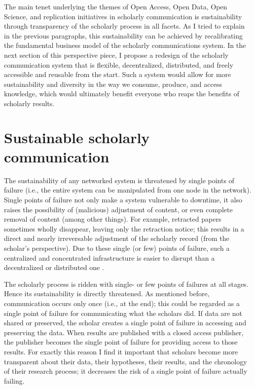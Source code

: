 \documentclass[]{tufte-book}
\begin{document}
The main tenet underlying the themes of Open Access, Open Data, Open
Science, and replication initiatives in scholarly communication is
sustainability through transparency of the scholarly process in all
facets. As I tried to explain in the previous paragraphs, this
sustainability can be achieved by recalibrating the fundamental business
model of the scholarly communications system. In the next section of
this perspective piece, I propose a redesign of the scholarly
communication system that is flexible, decentralized, distributed, and
freely accessible and reusable from the start. Such a system would allow
for more sustainability and diversity in the way we consume, produce,
and access knowledge, which would ultimately benefit everyone who reaps
the benefits of scholarly results.

\section{Sustainable scholarly
communication}\label{sustainable-scholarly-communication}

The sustainability of any networked system is threatened by single
points of failure (i.e., the entire system can be manipulated from one
node in the network). Single points of failure not only make a system
vulnerable to downtime, it also raises the possibility of (malicious)
adjustment of content, or even complete removal of content (among other
things). For example, retracted papers sometimes wholly disappear,
leaving only the retraction notice; this results in a direct and nearly
irreversable adjustment of the scholarly record (from the scholar's
perspective). Due to these single (or few) points of failure, such a
centralized and concentrated infrastructure is easier to disrupt than a
decentralized or distributed one \citep[see
also][]{10.1103/physreve.95.022313}.

The scholarly process is ridden with single- or few points of failures
at all stages. Hence its sustainability is directly threatened. As
mentioned before, communication occurs only once (i.e., at the end);
this could be regarded as a single point of failure for communicating
what the scholars did. If data are not shared or preserved, the scholar
creates a single point of failure in accessing and preserving the data.
When results are published with a closed access publisher, the publisher
becomes the single point of failure for providing access to those
results. For exactly this reason I find it important that scholars
become more transparent about their data, their hypotheses, their
results, and the chronology of their research process; it decreases the
risk of a single point of failure actually failing.
\end{document}
